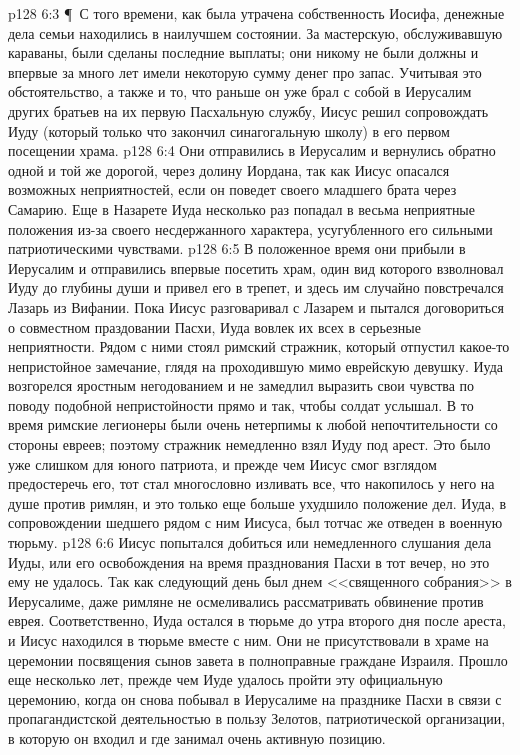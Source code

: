 \vs p128 6:3 \P\ С того времени, как была утрачена собственность Иосифа, денежные дела семьи находились в наилучшем состоянии. За мастерскую, обслуживавшую караваны, были сделаны последние выплаты; они никому не были должны и впервые за много лет имели некоторую сумму денег про запас. Учитывая это обстоятельство, а также и то, что раньше он уже брал с собой в Иерусалим других братьев на их первую Пасхальную службу, Иисус решил сопровождать Иуду (который только что закончил синагогальную школу) в его первом посещении храма.
\vs p128 6:4 Они отправились в Иерусалим и вернулись обратно одной и той же дорогой, через долину Иордана, так как Иисус опасался возможных неприятностей, если он поведет своего младшего брата через Самарию. Еще в Назарете Иуда несколько раз попадал в весьма неприятные положения из\hyp{}за своего несдержанного характера, усугубленного его сильными патриотическими чувствами.
\vs p128 6:5 В положенное время они прибыли в Иерусалим и отправились впервые посетить храм, один вид которого взволновал Иуду до глубины души и привел его в трепет, и здесь им случайно повстречался Лазарь из Вифании. Пока Иисус разговаривал с Лазарем и пытался договориться о совместном праздовании Пасхи, Иуда вовлек их всех в серьезные неприятности. Рядом с ними стоял римский стражник, который отпустил какое\hyp{}то непристойное замечание, глядя на проходившую мимо еврейскую девушку. Иуда возгорелся яростным негодованием и не замедлил выразить свои чувства по поводу подобной непристойности прямо и так, чтобы солдат услышал. В то время римские легионеры были очень нетерпимы к любой непочтительности со стороны евреев; поэтому стражник немедленно взял Иуду под арест. Это было уже слишком для юного патриота, и прежде чем Иисус смог взглядом предостеречь его, тот стал многословно изливать все, что накопилось у него на душе против римлян, и это только еще больше ухудшило положение дел. Иуда, в сопровождении шедшего рядом с ним Иисуса, был тотчас же отведен в военную тюрьму.
\vs p128 6:6 Иисус попытался добиться или немедленного слушания дела Иуды, или его освобождения на время празднования Пасхи в тот вечер, но это ему не удалось. Так как следующий день был днем <<священного собрания>> в Иерусалиме, даже римляне не осмеливались рассматривать обвинение против еврея. Соответственно, Иуда остался в тюрьме до утра второго дня после ареста, и Иисус находился в тюрьме вместе с ним. Они не присутствовали в храме на церемонии посвящения сынов завета в полноправные граждане Израиля. Прошло еще несколько лет, прежде чем Иуде удалось пройти эту официальную церемонию, когда он снова побывал в Иерусалиме на празднике Пасхи в связи с пропагандистской деятельностью в пользу Зелотов, патриотической организации, в которую он входил и где занимал очень активную позицию.
